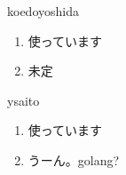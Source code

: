 \begin{prework}{ koedoyoshida }
  \begin{enumerate}
  \item 使っています
  \item 未定
  \end{enumerate}
\end{prework}

\begin{prework}{ ysaito }
  \begin{enumerate}
  \item 使っています
  \item うーん。golang?
  \end{enumerate}
\end{prework}
